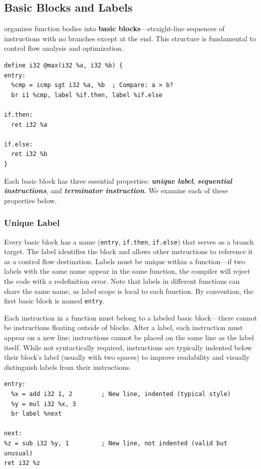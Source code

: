 \subsection{Basic Blocks and Labels}

 organizes function bodies into \textbf{basic blocks}---straight-line sequences of instructions with no branches except at the end. This structure is fundamental to control flow analysis and optimization.

\begin{lstlisting}[style=ir]
define i32 @max(i32 %a, i32 %b) {
entry:
  %cmp = icmp sgt i32 %a, %b  ; Compare: a > b?
  br i1 %cmp, label %if.then, label %if.else

if.then:
  ret i32 %a

if.else:
  ret i32 %b
}
\end{lstlisting}

Each basic block has three essential properties: \textbf{\textit{unique label}}, \textbf{\textit{sequential instructions}}, and \textbf{\textit{terminator instruction}}. We examine each of these properties below.

\subsubsection{Unique Label}

Every basic block has a name (\texttt{entry}, \texttt{if.then}, \texttt{if.else}) that serves as a branch target. The label identifies the block and allows other instructions to reference it as a control flow destination. Labels must be unique within a function---if two labels with the same name appear in the same function, the compiler will reject the code with a redefinition error. Note that labels in different functions can share the same name, as label scope is local to each function. By convention, the first basic block is named \texttt{entry}.

Each instruction in a function must belong to a labeled basic block---there cannot be instructions floating outside of blocks. After a label, each instruction must appear on a new line; instructions cannot be placed on the same line as the label itself. While not syntactically required, instructions are typically indented below their block's label (usually with two spaces) to improve readability and visually distinguish labels from their instructions.

\begin{lstlisting}[style=ir]
entry:
  %x = add i32 1, 2        ; New line, indented (typical style)
  %y = mul i32 %x, 3
  br label %next

next:
%z = sub i32 %y, 1         ; New line, not indented (valid but unusual)
ret i32 %z
\end{lstlisting}


